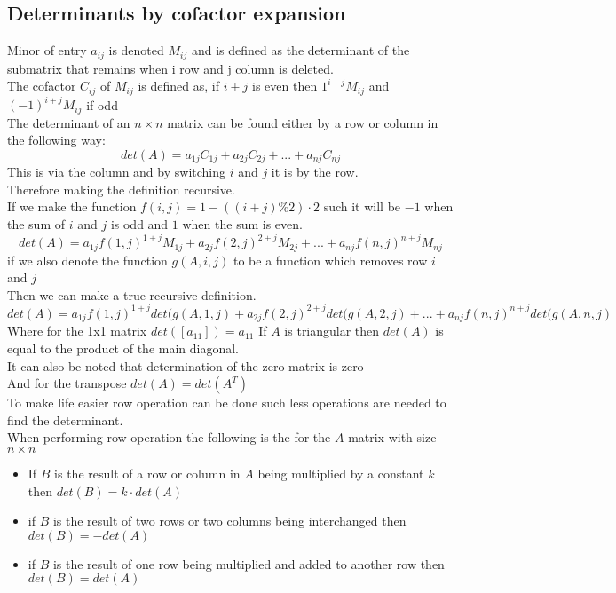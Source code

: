 \documentclass[12pt, a4paper]{article}
\begin{document}
		\subsection{Determinants by cofactor expansion}
			Minor of entry $a_{ij}$ is denoted $M_{ij}$ and is defined as the determinant of the submatrix that remains when i row and j column is deleted.\\
			The cofactor $C_{ij}$ of $M_{ij}$ is defined as, if $i+j$ is even then $1^{i+j}M_{ij}$ and $(-1)^{i+j}M_{ij}$ if odd\\
			The determinant of an $n\times n$ matrix can be found either by a row or column in the following way:
			$$det(A)=a_{1j}C_{1j}+a_{2j}C_{2j}+...+a_{nj}C_{nj}$$
			This is via the column and by switching $i$ and $j$ it is by the row.\\
			Therefore making the definition recursive.\\
			If we make the function $f(i,j)=1 - ((i+j) \% 2 ) \cdot 2$ such it will be $-1$ when the sum of $i$ and $j$ is odd and $1$ when the sum is even.
			$$det(A)=a_{1j}f(1,j)^{1+j}M_{1j}+a_{2j}f(2,j)^{2+j}M_{2j}+...+a_{nj}f(n,j)^{n+j}M_{nj}$$
			if we also denote the function $g(A,i,j)$ to be a function which removes row $i$ and $j$\\
			Then we can make a true recursive definition.\\
			$$det(A)=a_{1j}f(1,j)^{1+j}det(g(A,1,j)+a_{2j}f(2,j)^{2+j}det(g(A,2,j)+...+a_{nj}f(n,j)^{n+j}det(g(A,n,j)$$
			Where for the 1x1 matrix $det([a_{11}])=a_{11}$
			If $A$ is triangular then $det(A)$ is equal to the product of the main diagonal.\\[4mm]
			It can also be noted that determination of the zero matrix is zero\\
			And for the transpose $det(A)=det(A^T)$\\[4mm]
			To make life easier row operation can be done such less operations are needed to find the determinant.\\
			When performing row operation the following is the for the $A$ matrix with size $n\times n$
			\begin{itemize}
				\item If $B$ is the result of a row or column in $A$ being multiplied by a constant $k$ then $det(B)=k\cdot det(A)$
				\item if $B$ is the result of two rows or two columns being interchanged then $det(B)=-det(A)$
				\item if $B$ is the result of one row being multiplied and added to another row then $det(B)=det(A)$
			\end{itemize}
\end{document}
